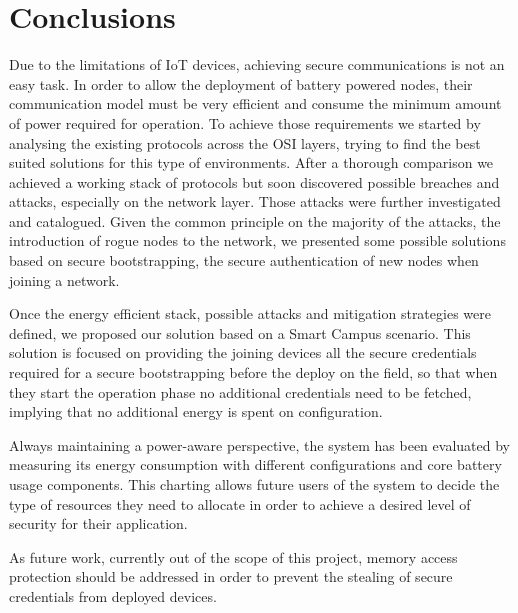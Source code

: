 \documentclass{sig-alternate-05-2015}
\begin{document}
\section{Conclusions}
Due to the limitations of \gls{IoT} devices, achieving secure communications is not an easy task. In order to allow the deployment of battery powered nodes, their communication model must be very efficient and consume the minimum amount of power required for operation. To achieve those requirements we started by analysing the existing protocols across the OSI layers, trying to find the best suited solutions for this type of environments. After a thorough comparison we achieved a working stack of protocols but soon discovered possible breaches and attacks, especially on the network layer. Those attacks were further investigated and catalogued. Given the common principle on the majority of the attacks, the introduction of rogue nodes to the network, we presented some possible solutions based on secure bootstrapping, the secure authentication of new nodes when joining a network.

Once the energy efficient stack, possible attacks and mitigation strategies were defined, we proposed our solution based on a Smart Campus scenario. This solution is focused on providing the joining devices all the secure credentials required for a secure bootstrapping before the deploy on the field, so that when they start the operation phase no additional credentials need to be fetched, implying that no additional energy is spent on configuration.

Always maintaining a power-aware perspective, the system has been evaluated by measuring its energy consumption with different configurations and core battery usage components. This charting allows future users of the system to decide the type of resources they need to allocate in order to achieve a desired level of security for their application.

As future work, currently out of the scope of this project, memory access protection should be addressed in order to prevent the stealing of secure credentials from deployed devices.

\end{document}
